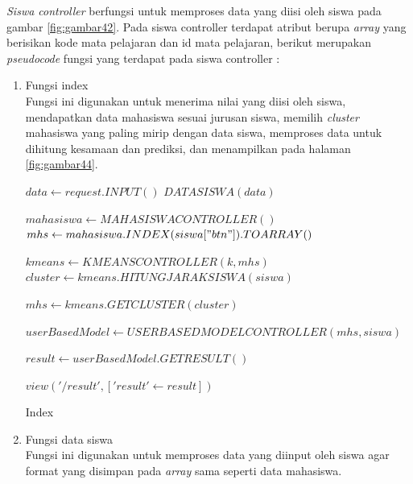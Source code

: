 \textit{Siswa controller} berfungsi untuk memproses data yang diisi oleh siswa pada gambar \ref{fig:gambar42}. Pada siswa controller terdapat atribut berupa \textit{array} yang berisikan kode mata pelajaran dan id mata pelajaran, berikut merupakan \textit{pseudocode} fungsi yang terdapat pada siswa controller :

\begin{enumerate}
    \item Fungsi index \\
        Fungsi ini digunakan untuk menerima nilai yang diisi oleh siswa, mendapatkan data mahasiswa sesuai jurusan siswa, memilih \textit{cluster} mahasiswa yang paling mirip dengan data siswa, memproses data untuk dihitung kesamaan dan prediksi, dan menampilkan pada halaman \ref{fig:gambar44}. \\
        
        \begin{algorithm}[H]
          \begin{algorithmic}[1]
                \State $data \gets request.INPUT()$
                \State $DATASISWA(data)$
                
                \State $mahasiswa \gets MAHASISWACONTROLLER()$
                \State $mhs \gets mahasiswa.INDEX(siswa["btn"]).TOARRAY()$
                
                \State $kmeans \gets KMEANSCONTROLLER(k, mhs)$ 
                \State $cluster \gets kmeans.HITUNGJARAKSISWA(siswa)$
                
                \State $mhs \gets kmeans.GETCLUSTER(cluster)$
                
                \State $userBasedModel \gets USERBASEDMODELCONTROLLER(mhs, siswa)$
                
                \State $result \gets userBasedModel.GETRESULT()$
                
                \State \Return $view('/result', ['result' \gets result])$
            \EndProcedure
          \end{algorithmic} 
          \caption{Index}
          \label{alg:index siswa controller}
        \end{algorithm}

    \item Fungsi data siswa \\
        Fungsi ini digunakan untuk memproses data yang diinput oleh siswa agar format yang disimpan pada \textit{array} sama seperti data mahasiswa.\\
        

\end{enumerate}

